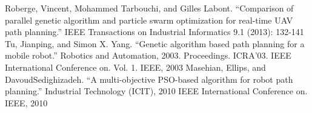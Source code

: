 \documentclass[conference]{IEEEtran}
\begin{document}
\begin{thebibliography}{00}
 Roberge, Vincent, Mohammed Tarbouchi, and Gilles Labont. ``Comparison of parallel genetic algorithm and particle swarm optimization for real-time UAV path planning.'' IEEE Transactions on Industrial Informatics 9.1 (2013): 132-141
 Tu, Jianping, and Simon X. Yang. ``Genetic algorithm based path planning for a mobile robot.'' Robotics and Automation, 2003. Proceedings. ICRA'03. IEEE International Conference on. Vol. 1. IEEE, 2003
 Masehian, Ellips, and DavoudSedighizadeh. ``A multi-objective PSO-based algorithm for robot path planning.'' Industrial Technology (ICIT), 2010 IEEE International Conference on. IEEE, 2010
\end{thebibliography}
\end{document}
